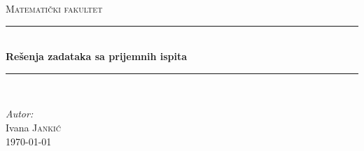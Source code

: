 \documentclass[a4paper,12pt]{report}
\begin{document}
\begin{titlepage}

\newcommand{\HRule}{\rule{\linewidth}{0.5mm}} %

\center %
 

\textsc{\LARGE Matemati\v{c}ki fakultet}\\[1.5cm]


\vfill
\vfill

\vfill
\HRule \\[0.4cm]
{ \huge \bfseries Re\v{s}enja zadataka sa prijemnih ispita}\\[0.4cm] %
\HRule \\[1.5cm]
 
\vfill 



\emph{Autor:}\\
Ivana \textsc{Janki\'{c}}\\[3cm] %


{\large \today}\\[3cm] %


 

\end{titlepage}
\tableofcontents
\end{document}

